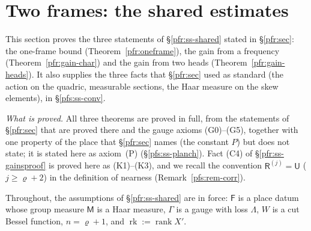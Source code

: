 \documentclass[10pt]{amsart}
\theoremstyle{definition}
\theoremstyle{remark}
\begin{document}
\providecommand{\panot}[1]{\par\smallskip{\raggedright\noindent\textbf{[Not proved here:} #1\textbf{]}\par}\smallskip}
\providecommand{\pbvol}{\operatorname{vol}}
\providecommand{\pfrG}{\mathsf G}
\providecommand{\pfrH}{\mathsf H}
\providecommand{\pfrU}{\mathsf U}
\providecommand{\pfrR}{\mathsf R}
\providecommand{\pfrM}{\mathsf M}
\providecommand{\pfrm}{\mathsf m}
\providecommand{\pfrK}{\mathsf K}
\providecommand{\pfrP}{\mathcal P}
\providecommand{\pfrI}{\mathcal I}
\providecommand{\pfrF}{\mathsf F}
\providecommand{\pfrB}{\mathsf B}
\providecommand{\pfrmod}{\operatorname{mod}}
\providecommand{\pfrdep}{\operatorname{dp}}
\providecommand{\pfrwt}{\wp}
\providecommand{\pfrkap}{\kappa}
\providecommand{\pfrN}{\mathsf N}
\providecommand{\pfrip}[2]{\langle#1,#2\rangle}
\providecommand{\pfsA}{\mathsf A}
\providecommand{\pfsBall}{\mathcal B}
\providecommand{\pfscm}{\operatorname{cm}}
\providecommand{\pfscut}{\operatorname{cut}}
\providecommand{\pfsCB}{\mathcal C\!\mathcal B}
\providecommand{\pfsc}{\mathsf c}
\providecommand{\pfsrk}{\operatorname{rk}}
\providecommand{\pfsfc}{\mathsf f}
\providecommand{\pfsO}{\mathcal O}
\providecommand{\pfsst}{\operatorname{St}}

\section{Two frames: the shared estimates}\label{pfs:sec}

This section proves the three statements of \S\ref{pfr:ss-shared} stated in
\S\ref{pfr:sec}: the one-frame bound (Theorem~\ref{pfr:oneframe}), the gain from a frequency
(Theorem~\ref{pfr:gain-char}) and the gain from two heads (Theorem~\ref{pfr:gain-heads}). It also
supplies the three facts that \S\ref{pfr:sec} used as standard (the action on the quadric, measurable
sections, the Haar measure on the skew elements), in \S\ref{pfs:ss-conv}.

\emph{What is proved.} All three theorems are proved in full, from the statements of \S\ref{pfr:sec}
that are proved there and the gauge axioms (G0)--(G5), together with one property of the place that
\S\ref{pfr:sec} names (the constant $P$) but does not state; it is stated here as axiom~(P)
(\S\ref{pfs:ss-planch}). Fact (C4) of \S\ref{pfr:ss-gainsproof} is proved here as (K1)--(K3), and we
recall the convention $\pfrR^{(j)}=\pfrU$ ($j\ge\varrho+2$) in the definition of nearness
(Remark~\ref{pfs:rem-corr}).

Throughout, the assumptions of \S\ref{pfr:ss-shared} are in force: $\pfrF$ is a place datum whose group
measure $\pfrM$ is a Haar measure, $\Gamma$ is a gauge with loss $\Lambda$, $W$ is a cut Bessel function,
$n=\varrho+1$, and $\pfsrk:=\operatorname{rank}X'$.
\end{document}
